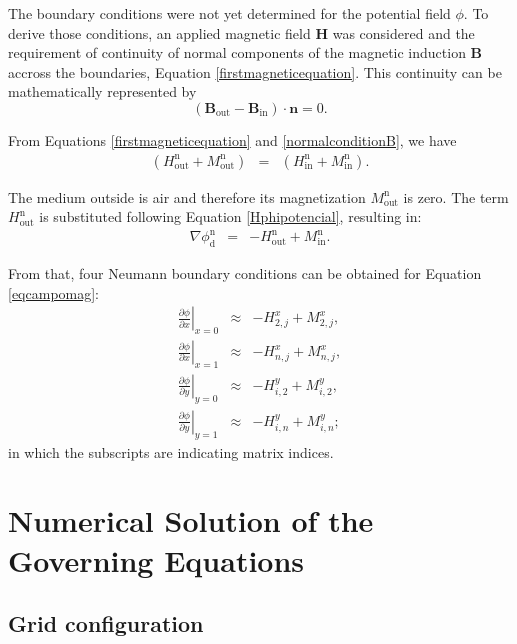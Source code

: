 \documentclass[journal]{IEEEtran}
\begin{document}
The boundary conditions were not yet determined for the potential field $\phi$. To derive those conditions, an applied magnetic field $\mathbf{H}$ was considered and the requirement of continuity of normal components of the magnetic induction $\mathbf{B}$ accross the boundaries, Equation \ref{firstmagneticequation}. This continuity can be mathematically represented by \begin{equation}\left(\mathbf{B}_{\mathrm{out}} - \mathbf{B}_{\mathrm{in}}\right)\cdot \mathbf{n} = 0 \label{normalconditionB}.\end{equation} 

From Equations \ref{firstmagneticequation} and \ref{normalconditionB}, we have \begin{eqnarray}
(H_{\mathrm{out}}^{\mathrm{n}} + M_{\mathrm{out}}^{\mathrm{n}}) &=&  (H_{\mathrm{in}}^{\mathrm{n}}+M_{\mathrm{in}}^{\mathrm{n}}).\label{normalConditionB2}
\end{eqnarray}

The medium outside is air and therefore its magnetization $M_{\mathrm{out}}^{\mathrm{n}}$ is zero. The term $H_{\mathrm{out}}^{\mathrm{n}}$ is substituted following  Equation \ref{Hphipotencial}, resulting  in: \begin{eqnarray}
\nabla\phi_{\mathrm{d}}^{\mathrm{n}} & = & -H_{\mathrm{out}}^{\mathrm{n}} + M_{\mathrm{in}}^{\mathrm{n}}. \label{nablaphid}
\end{eqnarray}

From that, four Neumann boundary conditions can be obtained for Equation \ref{eqcampomag}: \begin{eqnarray}
\left.\frac{\partial \phi}{\partial x}\right|_{x=0} &\approx& -H^{x}_{2,j} + M^{x}_{2,j}\label{condition1phi},\\
\left.\frac{\partial \phi}{\partial x}\right|_{x=1} &\approx& -H^{x}_{n,j} + M^{x}_{n,j},\\
\left.\frac{\partial \phi}{\partial y}\right|_{y=0} &\approx& -H^{y}_{i,2} + M^{y}_{i,2},\\
\left.\frac{\partial \phi}{\partial y}\right|_{y=1} &\approx& -H^{y}_{i,n} + M^{y}_{i,n};\label{condition4phi}
\end{eqnarray} in which the subscripts are indicating matrix indices.

\section{Numerical Solution of the Governing Equations}

\subsection{Grid configuration}
\end{document}
